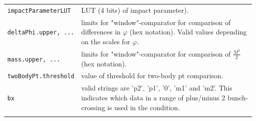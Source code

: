 \begin{longtable}{>{\footnotesize}l >{\footnotesize}p{}}
\verb|impactParameterLUT| & LUT (4 bits) of impact parameter).\\
\verb|deltaPhi.upper, ...| & limits for "window"-comparator for comparison of differences in $\varphi$ (hex notation). Valid values depending on the scales for $\varphi$.\\
\verb|mass.upper, ...| & limits for "window"-comparator for comparison of $\frac{M^2}{2}$ (hex notation).\\
\verb|twoBodyPt.threshold| & value of threshold for two-body pt comparison.\\
\verb|bx| & valid strings are 'p2', 'p1', '0', 'm1' and 'm2'. This indicates which data in a range of plus/minus 2 bunch-crossing is used in the condition.\\
\hline 
\label{tab:gtl:explanation_instance_calo_muon_correlation_condition_vhd}
\end{longtable}


\clearpage


